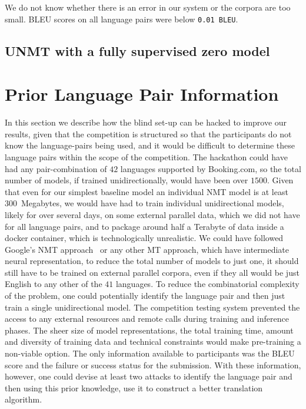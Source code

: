 \documentclass[]{article}
\begin{document}

We do not know whether there is an error in our system or the corpora are too small.
BLEU scores on all language pairs were below {\tt 0.01 BLEU}.

\subsection{\ac{UNMT} with a fully supervised zero model}
\label{sect:semi_unsupervised}

\section{Prior Language Pair Information}
\label{sect:non_blind}

In this section we describe how the blind set-up can be hacked to improve our results, given that the competition is structured so that the participants do not know the language-pairs being used, and it would be difficult to determine these language pairs within the scope of the competition.
The hackathon could have had any pair-combination of $42$ languages supported by {{Booking.com}}, so the total number of models, if trained unidirectionally, would have been over $1500$.
Given that even for our simplest baseline model an individual \ac{NMT} model is at least $300$~Megabytes, we would have had to train individual unidirectional models, likely for over several days, on some external parallel data, which we did not have for all language pairs, and to package around half a Terabyte of data inside a docker container, which is technologically unrealistic.
We could have followed Google's \ac{NMT} approach~\citep{johnson2016google} or any other \ac{MT} approach, which have intermediate neural representation, to reduce the total number of models to just one, it should still have to be trained on external parallel corpora, even if they all would be just English to any other of the $41$ languages.
To reduce the combinatorial complexity of the problem, one could potentially identify the language pair and then just train a single unidirectional model.
The competition testing system prevented the access to any external resources and remote calls during training and inference phases.
The sheer size of model representations, the total training time, amount and diversity of training data and technical constraints would make pre-training a non-viable option.
The only information available to participants was the BLEU score and the failure or success status for the submission.
With these information, however, one could devise at least two attacks to identify the language pair and then using this prior knowledge, use it to construct a better translation algorithm.
\end{document}
